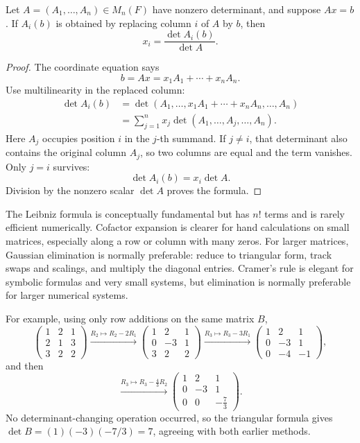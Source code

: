 \begin{theorem}\label{thm:cramers-rule}
Let \(A=(A_1,\ldots,A_n)\in M_n(F)\) have nonzero determinant, and suppose
\(Ax=b\).  If \(A_i(b)\) is obtained by replacing column \(i\) of \(A\) by
\(b\), then
\[
x_i=\frac{\det A_i(b)}{\det A}.
\]
\end{theorem}
\begin{proof}
The coordinate equation says
\[
b=Ax=x_1A_1+\cdots+x_nA_n.
\]
Use multilinearity in the replaced column:
\[
\begin{aligned}
\det A_i(b)
&=\det(A_1,\ldots,x_1A_1+\cdots+x_nA_n,\ldots,A_n)\\
&=\sum_{j=1}^n x_j
\det(A_1,\ldots,A_j,\ldots,A_n).
\end{aligned}
\]
Here \(A_j\) occupies position \(i\) in the \(j\)-th summand.  If \(j\ne i\),
that determinant also contains the original column \(A_j\), so two columns
are equal and the term vanishes.  Only \(j=i\) survives:
\[
\det A_i(b)=x_i\det A.
\]
Division by the nonzero scalar \(\det A\) proves the formula.
\end{proof}

\begin{remark}
The Leibniz formula is conceptually fundamental but has \(n!\) terms and is
rarely efficient numerically.  Cofactor expansion is clearer for hand
calculations on small matrices, especially along a row or column with many
zeros.  For larger matrices, Gaussian elimination is normally preferable:
reduce to triangular form, track swaps and scalings, and multiply the diagonal
entries.  Cramer's rule is elegant for symbolic formulas and very small
systems, but elimination is normally preferable for larger numerical systems.

For example, using only row additions on the same matrix \(B\),
\[
\begin{pmatrix}1&2&1\\2&1&3\\3&2&2\end{pmatrix}
\xrightarrow{R_2\mapsto R_2-2R_1}
\begin{pmatrix}1&2&1\\0&-3&1\\3&2&2\end{pmatrix}
\xrightarrow{R_3\mapsto R_3-3R_1}
\begin{pmatrix}1&2&1\\0&-3&1\\0&-4&-1\end{pmatrix},
\]
and then
\[
\xrightarrow{R_3\mapsto R_3-\frac43R_2}
\begin{pmatrix}1&2&1\\0&-3&1\\0&0&-\frac73\end{pmatrix}.
\]
No determinant-changing operation occurred, so the triangular formula gives
\(\det B=(1)(-3)(-7/3)=7\), agreeing with both earlier methods.
\end{remark}

